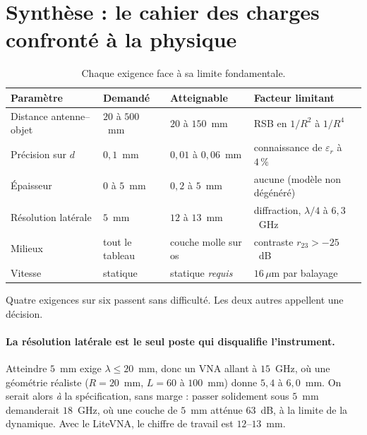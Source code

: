 \documentclass[11pt,a4paper]{article}
\newcommand{\eps}{\varepsilon_r}
\begin{document}
\section{Synthèse : le cahier des charges confronté à la physique}
\label{sec:synthese}

\begin{table}[h]
\centering
\caption{Chaque exigence face à sa limite fondamentale.}
\label{tab:cdc_revise}
\begin{tabular}{>{\raggedright\arraybackslash}p{3.4cm}%
                >{\raggedright\arraybackslash}p{2.6cm}%
                >{\raggedright\arraybackslash}p{4.2cm}%
                >{\raggedright\arraybackslash}p{4.4cm}}
\toprule
Paramètre & Demandé & Atteignable & Facteur limitant \\
\midrule
Distance antenne--objet & $20$ à $500$~mm & $20$ à $150$~mm &
  RSB en $1/R^2$ à $1/R^4$ \\[1mm]
Précision sur $d$ & $0{,}1$~mm & $0{,}01$ à $0{,}06$~mm &
  connaissance de $\eps$ à $4\,\%$ \\[1mm]
Épaisseur & $0$ à $5$~mm & $0{,}2$ à $5$~mm &
  aucune (modèle non dégénéré) \\[1mm]
Résolution latérale & $5$~mm & $12$ à $13$~mm &
  diffraction, $\lambda/4$ à $6{,}3$~GHz \\[1mm]
Milieux & tout le tableau & couche molle sur os &
  contraste $r_{23} > -25$~dB \\[1mm]
Vitesse & statique & statique \emph{requis} &
  $16\,\mu$m par balayage \\
\bottomrule
\end{tabular}
\end{table}

Quatre exigences sur six passent sans difficulté. Les deux autres appellent une
décision.

\paragraph{La résolution latérale est le seul poste qui disqualifie
l'instrument.} Atteindre $5$~mm exige $\lambda \le 20$~mm, donc un VNA allant à
$15$~GHz, où une géométrie réaliste ($R = 20$~mm, $L = 60$ à $100$~mm) donne
$5{,}4$ à $6{,}0$~mm. On serait alors \emph{à} la spécification, sans marge :
passer solidement sous $5$~mm demanderait $18$~GHz, où une couche de $5$~mm
atténue $63$~dB, à la limite de la dynamique. Avec le LiteVNA, le chiffre de
travail est $12$--$13$~mm.
\end{document}
